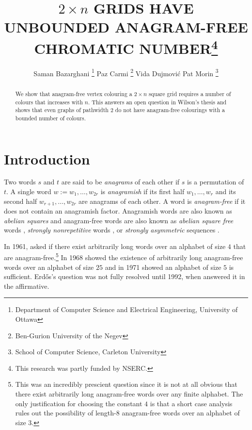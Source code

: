 \documentclass{patmorin}
\title{\MakeUppercase{$2\times n$ Grids have Unbounded Anagram-Free Chromatic Number}\thanks{This research was partly funded by NSERC.}}
\author{Saman Bazarghani%
    \thanks{Department of Computer Science and Electrical Engineering, University of Ottawa}\qquad
    Paz Carmi%
    \thanks{Ben-Gurion University of the Negev}\qquad
    Vida Dujmović\footnotemark[2]\qquad
    Pat Morin%
    \thanks{School of Computer Science, Carleton University}}
\date{}
\begin{document}
\maketitle

\begin{abstract}
    We show that anagram-free vertex colouring a $2\times n$ square grid requires a number of colours that increases with $n$.  This answers an open question in Wilson's thesis and shows that even graphs of pathwidth $2$ do not have anagram-free colourings with a bounded number of colours.
\end{abstract}

%



\section{Introduction}

Two words $s$ and $t$ are said to be \emph{anagrams} of each other if $s$ is a permutation of $t$.  A single word $w:=w_1,\ldots,w_{2r}$ is \emph{anagramish} if its first half $w_1,\ldots,w_r$ and its second half $w_{r+1},\ldots,w_{2r}$ are anagrams of each other.  A word is \emph{anagram-free} if it does not contain an anagramish factor.  Anagramish words are also known as \emph{abelian squares} and anagram-free words are also known as \emph{abelian square free} words \cite{keranen:abelian,keranen:powerful}, \emph{strongly nonrepetitive} words \cite{pleasants:non-repetitive}, or \emph{strongly asymmetric} sequences \cite{evdokimov:strongly,evdokimov:strongly2}.

In 1961, \citet{erdos:some} asked if there exist arbitrarily long words over an alphabet of size $4$ that are anagram-free.\footnote{This was an incredibly prescient question since it is not at all obvious that there exist arbitrarily long anagram-free words over any finite alphabet. The only justification for choosing the constant $4$ is that a short case analysis rules out the possibility of length-$8$ anagram-free words over an alphabet of size $3$.}  In 1968 \citet{evdokimov:strongly,evdokimov:strongly2} showed the existence of arbitrarily long anagram-free words over an alphabet of size $25$ and in 1971 \citet{pleasants:non-repetitive} showed an alphabet of size $5$ is sufficient.  Erd\H{o}s's question was not fully resolved until 1992, when \citet{keranen:abelian} answered it in the affirmative.
\end{document}
